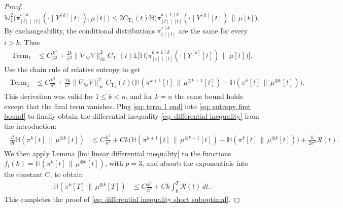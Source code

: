 \documentclass[11pt,reqno]{amsart}
\numberwithin{equation}{section}
\theoremstyle{definition}
\def\E{{\mathbb E}}
\newcommand{\wgrad}{\nabla_{\W}}
\newcommand{\W}{\mathbb W}
\newcommand{\ent}{ \mathbb H}
\begin{document}
\begin{proof}
    \begin{equation} \label{T1inequality-proof}
    \W_1^2\big(\pi_{[t]\mid [t]}^{i \mid k}(\cdot \mid Y^{[k]}[t]),\mu[t]\big) \le 2C_{\text{T}_1}(t) \ent\Big(\pi_{[t]\mid [t]}^{k+1\mid k}(\cdot\mid Y^{[k]}[t])\,\big\|\,\mu[t]\Big).
    \end{equation}
    By exchangeability, the conditional distributions $\pi^{i\mid k}_{t\mid [t]}$ are the same for every $i>k$. Thus 
    \begin{align}
    \text{Term}_1 &\le C\frac{k^3}{n^2} + \frac{2k}{\sigma^2}\|\wgrad V\|_\infty^2 C_{\text{T}_1}(t) \E\bigg[\ent\Big(\pi_{[t]\mid [t]}^{k+1\mid k}(\cdot\mid Y^{[k]}[t])\,\big\|\,\mu[t]\Big)\bigg].
    \end{align}
    Use the chain rule of relative entropy to get
    \begin{align}
    \begin{split}    \label{eq: term 1 end}
        \text{Term}_1&\leq C\frac{k^3}{n^2}+ \frac{2k}{\sigma^2}\|\wgrad V\|_\infty^2 C_{\text{T}_1}(t)\bigg(\ent(\pi^{k+1}[t]\,\|\,\mu^{\otimes k+1}[t])-\ent(\pi^k[t]\,\|\,\mu^{\otimes k}[t])\bigg).
    \end{split}
    \end{align}
    This derivation was valid for $1 \le k < n$, and for $k=n$ the same bound holds except that the final term vanishes.
    Plug \eqref{eq: term 1 end} into \eqref{eq: entropy first bound} to finally obtain the differential inequality \eqref{eq: differential inequality} from the introduction:
    \begin{align}
    \begin{split}
    \label{eq: differential inequality end}
    \frac{d}{dt}\ent(\pi^k[t]\,\|\,\mu^{\otimes k}[t])&\leq C\frac{k^3}{n^2} +Ck\bigg(\ent(\pi^{k+1}[t]\,\|\,\mu^{\otimes k+1}[t])-\ent(\pi^k[t]\,\|\,\mu^{\otimes k}[t])\bigg) +\frac{k}{2\sigma^2}\mathcal R(t).
    \end{split}
\end{align}
We then apply Lemma \ref{lm: linear differential inequality} to the functions $f_t(k) = \ent(\pi^k[t]\,\|\,\mu^{\otimes k}[t])$, with $p=3$, and absorb the exponentials into the constant $C$, to obtain
\begin{align*}
    \ent(\pi^k[T]\,\|\,\mu^{\otimes k}[T])&\le C\frac{k^3}{n^2}+C k\int_0^T \mathcal R(t)\,dt.
\end{align*}
This completes the proof of \eqref{eq: differential inequality short suboptimal}.


\end{proof}
\end{document}
